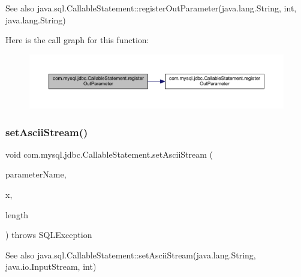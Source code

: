 \begin{DoxySeeAlso}{See also}
java.\+sql.\+Callable\+Statement\+::register\+Out\+Parameter(java.\+lang.\+String, int, java.\+lang.\+String) 
\end{DoxySeeAlso}
Here is the call graph for this function\+:\nopagebreak
\begin{figure}[H]
\begin{center}
\leavevmode
\includegraphics[width=350pt]{classcom_1_1mysql_1_1jdbc_1_1_callable_statement_a8b1ce8c9788c3c3cdcd60db1aeebe961_cgraph}
\end{center}
\end{figure}
\mbox{\label{classcom_1_1mysql_1_1jdbc_1_1_callable_statement_a02cd11a7e7dee124ce3db9f58a946e84}} 
\subsubsection{\texorpdfstring{set\+Ascii\+Stream()}{setAsciiStream()}}
{\footnotesize\ttfamily void com.\+mysql.\+jdbc.\+Callable\+Statement.\+set\+Ascii\+Stream (\begin{DoxyParamCaption}\item[{String}]{parameter\+Name,  }\item[{Input\+Stream}]{x,  }\item[{int}]{length }\end{DoxyParamCaption}) throws S\+Q\+L\+Exception}

\begin{DoxySeeAlso}{See also}
java.\+sql.\+Callable\+Statement\+::set\+Ascii\+Stream(java.\+lang.\+String, java.\+io.\+Input\+Stream, int) 
\end{DoxySeeAlso}
\mbox{\label{classcom_1_1mysql_1_1jdbc_1_1_callable_statement_a0750a163eddbe81b5cd66567669e32ac}} 
